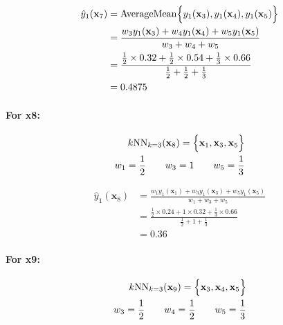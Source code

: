 \documentclass[12pt]{article}
\begin{document}
\begin{enumerate}[leftmargin=\labelsep]
\begin{enumerate}
        \begin{equation}
        \begin{split}
            \hat{y}_1(\mathbf{x}_7) &= \textrm{AverageMean}\Bigl\{ y_1(\mathbf{x}_3), y_1(\mathbf{x}_4), y_1(\mathbf{x}_5) \Bigr\} \\
            &= \frac{w_3y_1(\mathbf{x}_3) + w_4y_1(\mathbf{x}_4) + w_5y_1(\mathbf{x}_5)}{w_3 + w_4 + w_5} \\
            &= \frac{\frac{1}{2} \times 0.32 + \frac{1}{2} \times 0.54 + \frac{1}{3} \times 0.66}{\frac{1}{2} + \frac{1}{2} + \frac{1}{3}} \\
            &= 0.4875
        \end{split}
        \end{equation}

        \paragraph{For x8:}

        \begin{equation}
        \begin{split}
            k\textrm{NN}_{k = 3}(\mathbf{x}_8) = \Bigl\{ \mathbf{x}_1, \mathbf{x}_3, \mathbf{x}_5\Bigr\} \\
            w_1 = \frac{1}{2} \qquad w_3 = 1 \qquad w_5 = \frac{1}{3}
        \end{split}
        \end{equation}

        \begin{equation}
        \begin{split}
            \hat{y}_1(\mathbf{x}_8) &= \frac{w_1y_1(\mathbf{x}_1) + w_3y_1(\mathbf{x}_3) + w_5y_1(\mathbf{x}_5)}{w_1 + w_3 + w_5} \\
            &= \frac{\frac{1}{2} \times 0.24 + 1 \times 0.32 + \frac{1}{3} \times 0.66}{\frac{1}{2} + 1 + \frac{1}{3}} \\
            &= 0.36
        \end{split}
        \end{equation}

        \paragraph{For x9:}

        \begin{equation}
        \begin{split}
            k\textrm{NN}_{k = 3}(\mathbf{x}_9) = \Bigl\{ \mathbf{x}_3, \mathbf{x}_4, \mathbf{x}_5\Bigr\} \\
            w_3 = \frac{1}{2} \qquad w_4 = \frac{1}{2} \qquad w_5 = \frac{1}{3}
        \end{split}
        \end{equation}


\end{enumerate}
\end{enumerate}
\end{document}
